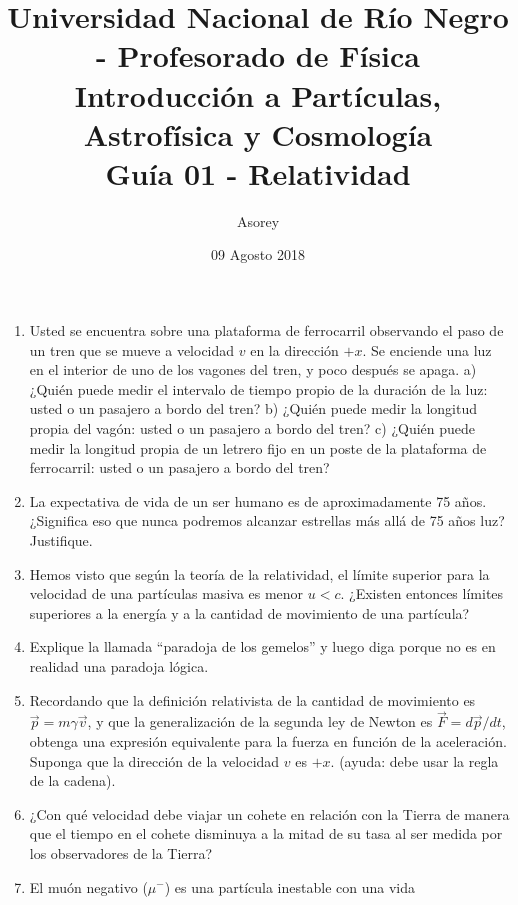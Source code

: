 \documentclass[a4paper,12pt]{article}
\begin{document}
\title{
{\normalsize{Universidad Nacional de Río Negro - Profesorado de Física}}\\
Introducción a Partículas, Astrofísica y Cosmología \\ Guía 01 - Relatividad\\}
\author{Asorey}
\date{09 Agosto 2018}
\maketitle

\begin{enumerate}
	\setcounter{enumi}{0}      %
	\item Usted se encuentra sobre una plataforma de ferrocarril observando el
		paso de un tren que se mueve a velocidad $v$ en la dirección $+x$. Se
		enciende una luz en el interior de uno de los vagones del tren, y poco
		después se apaga. a) ¿Quién puede medir el intervalo de tiempo propio
		de la duración de la luz: usted o un pasajero a bordo del tren? b)
		¿Quién puede medir la longitud propia del vagón: usted o un pasajero a
		bordo del tren? c) ¿Quién puede medir la longitud propia de un letrero
		fijo en un poste de la plataforma de ferrocarril: usted o un pasajero a
		bordo del tren?
	\item La expectativa de vida de un ser humano es de aproximadamente 75
		años. ¿Significa eso que nunca podremos alcanzar estrellas más allá de
		75 años luz? Justifique. 
	\item Hemos visto que según la teoría de la relatividad, el límite superior
		para la velocidad de una partículas masiva es menor $u < c$. ¿Existen
		entonces límites superiores a la energía y a la cantidad de movimiento
		de una partícula?
	\item Explique la llamada ``paradoja de los gemelos'' y luego diga porque
		no es en realidad una paradoja lógica.
	\item Recordando que la definición relativista de la cantidad de movimiento
		es $\vec{p}=m \gamma \vec{v}$, y que la generalización de la segunda
		ley de Newton es $\vec{F}=d\vec{p}/dt$, obtenga una expresión
		equivalente para la fuerza en función de la aceleración. Suponga que la
		dirección de la velocidad $v$ es $+x$. (ayuda: debe usar la regla de la
		cadena).   
	\item ¿Con qué velocidad debe viajar un cohete en relación con la Tierra de
		manera que el tiempo en el cohete disminuya a la mitad de su tasa al
		ser medida por los observadores de la Tierra?
	\item El muón negativo ($\mu^-$) es una partícula inestable con una vida

\end{enumerate}
\end{document}
